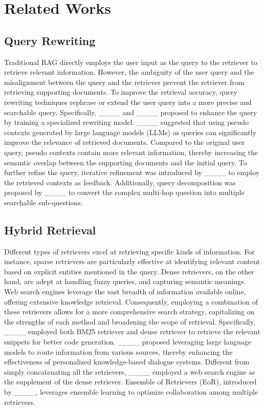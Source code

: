 \section{Related Works}
\subsection{Query Rewriting}
Traditional RAG directly employs the user input as the query to the retriever to retrieve relevant information. However, the ambiguity of the user query and the misalignment between the query and the retriever prevent the retriever from retrieving supporting documents. To improve the retrieval accuracy, query rewriting techniques rephrase or extend the user query into a more precise and searchable query.
Specifically, ____ and ____ proposed to enhance the query by training a specialized rewriting model.
____ suggested that using pseudo contexts generated by large language models (LLMs) as queries can significantly improve the relevance of retrieved documents. Compared to the original user query, pseudo contexts contain more relevant information, thereby increasing the semantic overlap between the supporting documents and the initial query. To further refine the query, iterative refinement was introduced by ____ to employ the retrieved contexts as feedback. Additionally, query decomposition was proposed by ____ to convert the complex multi-hop question into multiple searchable sub-questions. 

\subsection{Hybrid Retrieval}
Different types of retrievers excel at retrieving specific kinds of information. For instance, sparse retrievers are particularly effective at identifying relevant content based on explicit entities mentioned in the query. Dense retrievers, on the other hand, are adept at handling fuzzy queries, and capturing semantic meanings. Web search engines leverage the vast breadth of information available online, offering extensive knowledge retrieval. Consequently, employing a combination of these retrievers allows for a more comprehensive search strategy, capitalizing on the strengths of each method and broadening the scope of retrieval.
Specifically, ____ employed both BM25 retriever and dense retriever to retrieve the relevant snippets for better code generation. ____ proposed leveraging large language models to route information from various sources, thereby enhancing the effectiveness of personalized knowledge-based dialogue systems. Different from simply concatenating all the retrievers, ____ employed a web search engine as the supplement of the dense retriever. Ensemble of Retrievers (EoR), introduced by ____, leverages ensemble learning to optimize collaboration among multiple retrievers. 

